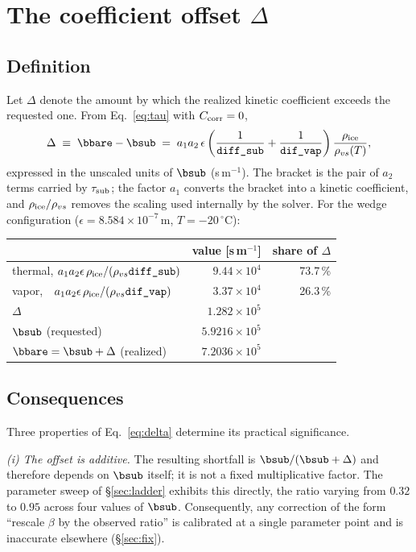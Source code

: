 \section{The coefficient offset $\Delta$}\label{sec:delta}

\subsection{Definition}
Let $\Delta$ denote the amount by which the realized kinetic coefficient exceeds the
requested one. From Eq.~\eqref{eq:tau} with $C_{\rm corr}=0$,
\begin{equation}
\Delta \;\equiv\; \bbare-\bsub \;=\; a_1a_2\,\epsilon
\left(\frac{1}{\texttt{diff\_sub}}+\frac{1}{\texttt{dif\_vap}}\right)
\frac{\rho_{\rm ice}}{\rho_{vs}(T)} ,
\label{eq:delta}
\end{equation}
expressed in the unscaled units of $\bsub$ (s\,m$^{-1}$). The bracket is the pair of $a_2$
terms carried by $\tau_{\rm sub}$; the factor $a_1$ converts the bracket into a kinetic
coefficient, and $\rho_{\rm ice}/\rho_{vs}$ removes the scaling used internally by the
solver. For the wedge configuration ($\epsilon=8.584\times10^{-7}$\,m,
$T=-20\,^\circ$C):
\begin{center}\small\begin{tabular}{lrr}\toprule
 & value [s\,m$^{-1}$] & share of $\Delta$\\ \midrule
thermal, $a_1a_2\epsilon\,\rho_{\rm ice}/(\rho_{vs}\texttt{diff\_sub})$ & $9.44\times10^{4}$ & 73.7\,\%\\
vapor, \ \,$a_1a_2\epsilon\,\rho_{\rm ice}/(\rho_{vs}\texttt{dif\_vap})$ & $3.37\times10^{4}$ & 26.3\,\%\\ \midrule
$\Delta$ & $1.282\times10^{5}$ & \\
$\bsub$ (requested) & $5.9216\times10^{5}$ & \\
$\bbare=\bsub+\Delta$ (realized) & $7.2036\times10^{5}$ & \\ \bottomrule
\end{tabular}\end{center}

\subsection{Consequences}
Three properties of Eq.~\eqref{eq:delta} determine its practical significance.

\emph{(i) The offset is additive.} The resulting shortfall is $\bsub/(\bsub+\Delta)$ and
therefore depends on $\bsub$ itself; it is not a fixed multiplicative factor. The
parameter sweep of \S\ref{sec:ladder} exhibits this directly, the ratio varying from
$0.32$ to $0.95$ across four values of $\bsub$. Consequently, any correction of the form
``rescale $\beta$ by the observed ratio'' is calibrated at a single parameter point and is
inaccurate elsewhere (\S\ref{sec:fix}).

